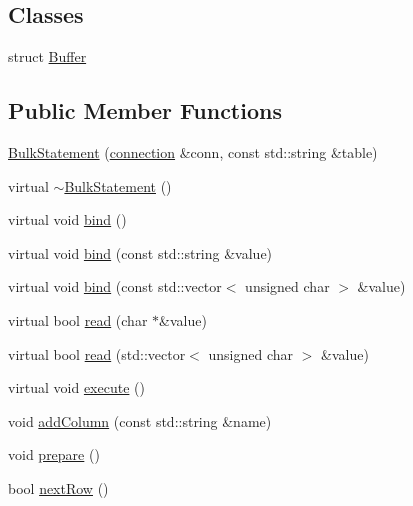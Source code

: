 \subsection*{Classes}
\begin{DoxyCompactItemize}
\item 
struct \hyperlink{structdbo_1_1stmt_1_1_bulk_statement_1_1_buffer}{Buffer}
\end{DoxyCompactItemize}
\subsection*{Public Member Functions}
\begin{DoxyCompactItemize}
\item 
\hyperlink{classdbo_1_1stmt_1_1_bulk_statement_a65ab5513c7c7ac521101f8373d160c8d}{Bulk\+Statement} (\hyperlink{classdbo_1_1connection}{connection} \&conn, const std\+::string \&table)
\item 
virtual \hyperlink{classdbo_1_1stmt_1_1_bulk_statement_ab6d5e3e1f6105d0a776c3a59a1e4ef1d}{$\sim$\+Bulk\+Statement} ()
\item 
virtual void \hyperlink{classdbo_1_1stmt_1_1_bulk_statement_ae40b794caf52eb3e1cafaef7eeb2042c}{bind} ()
\item 
virtual void \hyperlink{classdbo_1_1stmt_1_1_bulk_statement_ae12881728ef31a7acc0903d7473a8cb9}{bind} (const std\+::string \&value)
\item 
virtual void \hyperlink{classdbo_1_1stmt_1_1_bulk_statement_a36ca4fb16d32d17b838fe4604ebf2139}{bind} (const std\+::vector$<$ unsigned char $>$ \&value)
\item 
virtual bool \hyperlink{classdbo_1_1stmt_1_1_bulk_statement_ae789fa6e80389758303064fcceafb597}{read} (char $\ast$\&value)
\item 
virtual bool \hyperlink{classdbo_1_1stmt_1_1_bulk_statement_aaa5722c838af4203ae19bd94448d63dd}{read} (std\+::vector$<$ unsigned char $>$ \&value)
\item 
virtual void \hyperlink{classdbo_1_1stmt_1_1_bulk_statement_af2cde35cc87094525b4dc1e4dc99c710}{execute} ()
\item 
void \hyperlink{classdbo_1_1stmt_1_1_bulk_statement_ad9df1762cc49be8a6a377b69d3e3e3fd}{add\+Column} (const std\+::string \&name)
\item 
void \hyperlink{classdbo_1_1stmt_1_1_bulk_statement_a5ac1aa607b913ee63d3725f647169cbc}{prepare} ()
\item 
bool \hyperlink{classdbo_1_1stmt_1_1_bulk_statement_af80513fee94043fe22ac8797efd40139}{next\+Row} ()
\end{DoxyCompactItemize}
